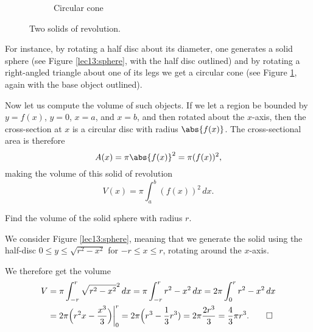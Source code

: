 \begin{figure}[b]
\begin{subfigure}{0.4\linewidth}
		\caption{Circular cone}
		\label{lec13:circularcone}
	\end{subfigure}
	\caption{Two solids of revolution.}
	\label{lec13:exsolidsofrevolution}
\end{figure}

For instance, by rotating a half disc about its diameter, one generates a solid sphere (see Figure \ref{lec13:sphere}, with the half disc outlined) and by rotating a right-angled triangle about one of its legs we get a circular cone (see Figure \ref{lec13:circularcone}, again with the base object outlined).

Now let us compute the volume of such objects.
If we let a region be bounded by $y = f(x)$, $y = 0$, $x = a$, and $x = b$, and then rotated about the $x$-axis, then the cross-section at $x$ is a circular disc with radius $\abs{f(x)}$.
The cross-sectional area is therefore
\[
	A(x) = \pi \abs{f(x)}^2 = \pi (f(x))^2,
\]
making the volume of this solid of revolution
\[
	V(x) = \pi \int_a^b (f(x))^2 \, d x.
\]

\begin{example}
	Find the volume of the solid sphere with radius $r$.

	We consider Figure \ref{lec13:sphere}, meaning that we generate the solid using the half-disc $0 \leq y \leq \sqrt{r^2 - x^2}$ for $-r \leq x \leq r$, rotating around the $x$-axis.

	We therefore get the volume
	\begin{align*}
		V &= \pi \int_{-r}^r \sqrt{r^2 - x^2}^2 \, d x = \pi \int_{-r}^r r^2 - x^2 \, dx  = 2 \pi \int_0^r r^2 - x^2 \, d x \\
		  &= 2 \pi \Big ( r^2 x - \frac{x^3}{3} \Big ) \biggr \rvert_0^r = 2 \pi \Big ( r^3 - \frac{1}{3} r^3) = 2 \pi \frac{2r^3}{3} = \frac{4}{3} \pi r^3. \qedhere
	\end{align*}
\end{example}


